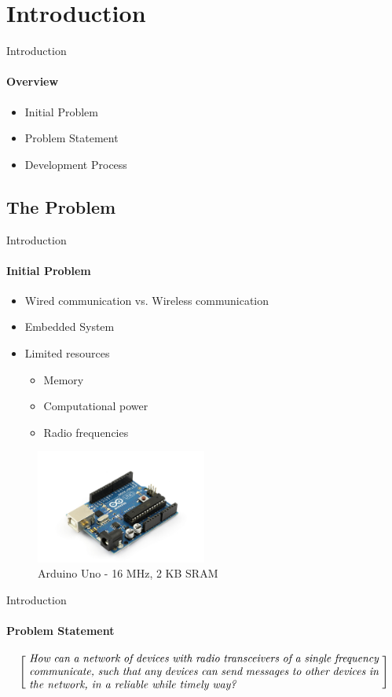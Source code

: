 \section{Introduction}
\begin{frame}{Introduction}\framesubtitle{Overview}
    \begin{itemize}
        \item Initial Problem
        \item Problem Statement
        \item Development Process 
    \end{itemize}
\end{frame}
\subsection{The Problem}
\begin{frame}[t]{Introduction}\framesubtitle{Initial Problem}
	\begin{itemize}
        \item Wired communication vs. Wireless communication
        \item Embedded System 
        \item Limited resources
            \begin{itemize}
                \item Memory
                \item Computational power
                \item Radio frequencies
            \end{itemize}
    \end{itemize}
    \begin{figure}
        \footnotesize
        \centering
        \includegraphics[width=0.5\textwidth,trim={3cm 0.5cm 3cm 3cm},clip]{images/arduino_uno.jpg}
        \caption{Arduino Uno - 16 MHz, 2 KB SRAM}
    \end{figure}
\end{frame}
\begin{frame}{Introduction}\framesubtitle{Problem Statement}
\[
\left[
\begin{minipage}{0.95\textwidth}
\centering
\itshape
\begin{minipage}{0.98\textwidth}
How can a network of devices with radio transceivers of a single frequency communicate, such that any devices can send messages to other devices in the network, in a reliable while timely way?
\end{minipage}
\end{minipage}
\right]
\]
\end{frame}
